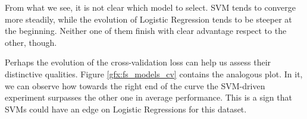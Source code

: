 	From what we see, it is not clear which model to select. \acs{SVM} tends to converge more steadily, while the evolution of Logistic Regression tends to be steeper at the beginning. Neither one of them finish with clear advantage respect to the other, though.

	Perhaps the evolution of the cross-validation loss can help us assess their distinctive qualities. Figure \ref{gfx:fs_models_cv} contains the analogous plot. In it, we can observe how towards the right end of the curve the \acs{SVM}-driven experiment surpasses the other one in average performance. This is a sign that \acs{SVM}s could have an edge on Logistic Regressions for this dataset.

\newpage

	\begin{figure}[bth]

        \begin{center}

        	\setlength{\fboxrule}{0pt}


\end{center}
\end{figure}
